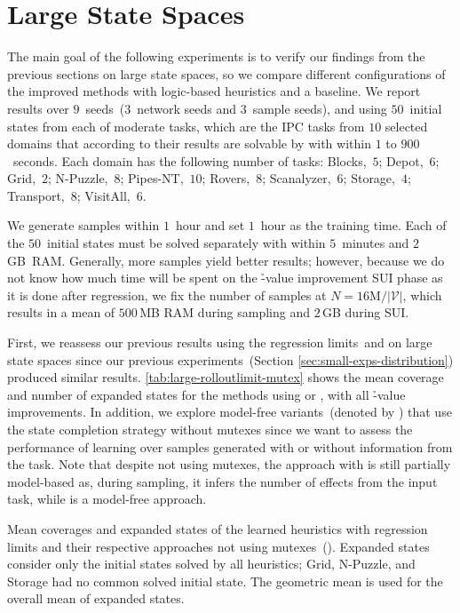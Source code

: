 \section{Large State Spaces}
\label{sec:large-experiments}

The main goal of the following experiments is to verify our findings from the previous sections on large state spaces, so we compare different configurations of the improved methods with logic-based heuristics and a baseline. We report results over $9$~seeds~($3$~network seeds and $3$~sample seeds), and using $50$~initial states from each of \citet{ferber2022neural} moderate tasks, which are the IPC tasks from $10$ selected domains that according to their results are solvable by \gbfs with \hff within $1$ to $900$~seconds. Each domain has the following number of tasks: Blocks,~$5$; Depot,~$6$; Grid,~$2$; N-Puzzle,~$8$; Pipes-NT,~$10$; Rovers,~$8$; Scanalyzer,~$6$; Storage,~$4$; Transport,~$8$; VisitAll,~$6$.

We generate samples within $1$~hour and set $1$~hour as the training time. Each of the $50$~initial states must be solved separately with \gbfs within $5$~minutes and $2$\,GB~RAM. Generally, more samples yield better results; however, because we do not know how much time will be spent on the \h-value improvement SUI phase as it is done after regression, we fix the number of samples at $N = 16\text{M} / |\mathcal{V}|$, which results in a mean of $500$\,MB RAM during sampling and $2$\,GB during SUI.

First, we reassess our previous results using the regression limits~\rlfacts and \rlmeanfx on large state spaces since our previous experiments~(Section \ref{sec:small-exps-distribution}) produced similar results. \cref{tab:large-rolloutlimit-mutex} shows the mean coverage and number of expanded states for the methods using \rlfacts or \rlmeanfx, with all \h-value improvements. In addition, we explore model-free variants~(denoted by \hnnnomutex) that use the state completion strategy without mutexes since we want to assess the performance of learning over samples generated with or without information from the task. Note that despite not using mutexes, the approach with \hnnnomutexl{\rlmeanfx} is still partially model-based as, during sampling, it infers the number of effects from the input task, while \hnnnomutexl{\rlfacts} is a model-free approach.

\begin{table}[tb]
    \caption[Results of the learned heuristics with and without mutexes.]{Mean coverages and expanded states of the learned heuristics with regression limits and their respective approaches not using mutexes~(\hnnnomutex). Expanded states consider only the initial states solved by all heuristics; Grid, N-Puzzle, and Storage had no common solved initial state. The geometric mean is used for the overall mean of expanded states.}
    \label{tab:large-rolloutlimit-mutex}
    \addmargin
    \centering
    
\end{table}

